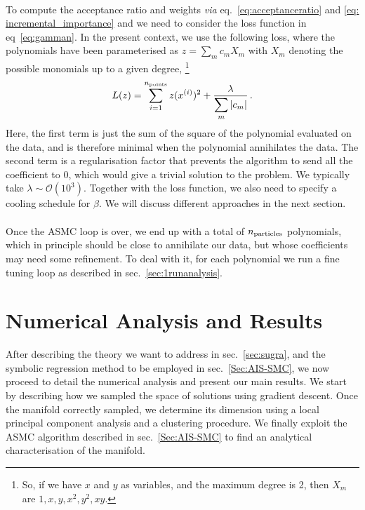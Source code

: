 \documentclass[11pt,a4paper]{article}
\begin{document}
	\paragraph{}
	To compute the acceptance ratio and weights \textit{via} eq.~\eqref{eq:acceptanceratio} and \eqref{eq: incremental_importance} and we need to consider the loss function in eq~\eqref{eq:gamman}.
	In the present context, we use the following loss, where the polynomials have been parameterised as $z = \sum_m c_m X_m$ with $X_m$ denoting the possible monomials up to a given degree,%
	\footnote{So, if we have $x$ and $y$ as variables, and the maximum degree is 2, then $X_m$ are $1, x, y, x^2, y^2, x y$.}
	\begin{equation} \label{eq:lossreg}
		L(z) = \sum_{i=1}^{n_{\rm points}} z(x^{(i)})^2 + \frac{\lambda}{\displaystyle \sum_m |c_m|}\,.
	\end{equation}
	Here, the first term is just the sum of the square of the polynomial evaluated on the data, and is therefore minimal when the polynomial annihilates the data. 
	The second term is a regularisation factor that prevents the algorithm to send all the coefficient to 0, which would give a trivial solution to the problem. 
	We typically take $\lambda \sim \mathcal{O}(10^3)$. 
	Together with the loss function, we also need to specify a cooling schedule for $\beta$. We will discuss different approaches in the next section.
	
	\paragraph{}
	Once the ASMC loop is over, we end up with a total of $n_{\rm particles}$ polynomials, which in principle should be close to annihilate our data, but whose coefficients may need some refinement. To deal with it, for each polynomial we run a fine tuning loop as described in sec.~\ref{sec:1runanalysis}.
	
\section{Numerical Analysis and Results} \label{sec:results}
After describing the theory we want to address in sec.~\ref{sec:sugra}, and the symbolic regression method to be employed in sec.~\ref{Sec:AIS-SMC}, we now proceed to detail the numerical analysis and present our main results. 
We start by describing how we sampled the space of solutions using gradient descent. Once the manifold correctly sampled, we determine its dimension using a local principal component analysis and a clustering procedure. We finally exploit the ASMC algorithm described in sec.~\ref{Sec:AIS-SMC} to find an analytical characterisation of the manifold.
\end{document}
